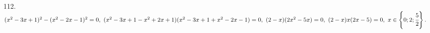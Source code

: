 112. $(x^2-3x+1)^2-(x^2-2x-1)^2=0,\ (x^2-3x+1-x^2+2x+1)(x^2-3x+1+x^2-2x-1)=0,\ (2-x)(2x^2-5x)=0,\ (2-x)x(2x-5)=0,\ x\in\left\{0;2;\cfrac{5}{2}\right\}.$\\
